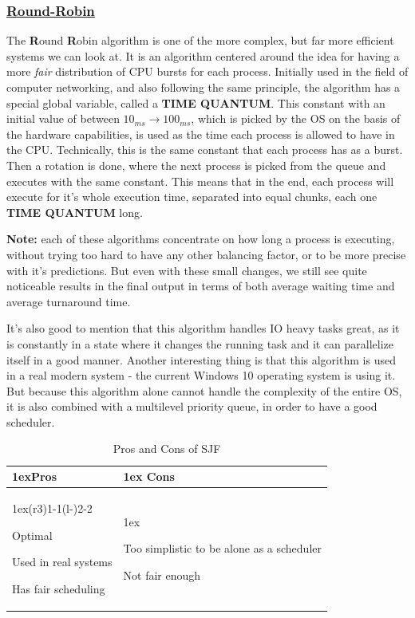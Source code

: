 \documentclass{article}
\begin{document}
\subsubsection{\underline{Round-Robin}}

The \textbf{R}ound \textbf{R}obin algorithm is one of the more complex, but far more efficient systems we can look at. It is an algorithm centered around the idea for having a more \textit{fair} distribution of CPU bursts for each process. Initially used in the field of computer networking, and also following the same principle, the algorithm has a special global variable, called a \textbf{TIME QUANTUM}. This constant with an initial value of between $10_{ms} \to 100_{ms}$, which is picked by the OS on the basis of the hardware capabilities, is used as the time each process is allowed to have in the CPU. Technically, this is the same constant that each process has as a burst. Then a rotation is done, where the next process is picked from the queue and executes with the same constant. This means that in the end, each process will execute for it's whole execution time, separated into equal chunks, each one \textbf{TIME QUANTUM} long.

\textbf{Note:} each of these algorithms concentrate on how long a process is executing, without trying too hard to have any other balancing factor, or to be more precise with it's predictions. But even with these small changes, we still see quite noticeable results in the final output in terms of both average waiting time and average turnaround time.

It's also good to mention that this algorithm handles IO heavy tasks great, as it is constantly in a state where it changes the running task and it can parallelize itself in a good manner. Another interesting thing is that this algorithm is used in a real modern system - the current Windows 10 operating system is using it. But because this algorithm alone cannot handle the complexity of the entire OS, it is also combined with a multilevel priority queue, in order to have a good scheduler.

\begin{table}[H]
  \begin{tabularx}{\linewidth}{>{\parskip1ex}X@{\kern4\tabcolsep}>{\parskip1ex}X}
    \toprule
    \hfil\bfseries Pros & \hfil\bfseries Cons \\
    \cmidrule(r{3\tabcolsep}){1-1}\cmidrule(l{-\tabcolsep}){2-2}

    Optimal\par
    Used in real systems\par
    Has fair scheduling\par

    &

    Too simplistic to be alone as a scheduler\par
    Not fair enough \\
    \bottomrule
  \end{tabularx}
  \caption{Pros and Cons of SJF}
\end{table}
\end{document}
